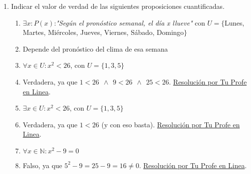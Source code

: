 \documentclass[a4paper]{article}
\newcommand{\answer}{\item[**]}
\newcommand{\exercise}{\item}
\newcommand{\then}{\to}
\newcommand{\eq}{\leftrightarrow}
\begin{document}
\begin{enumerate}
\begin{enumerate} [label=(\alph*)]
		\item Si un automóvil es cómodo, entonces es caro
		\answer ado el universo $U = \{x ~|~ x$ es un automóvil$\}$ y los predicados $P(x)$:\textit{"$x$ es cómodo"} y $Q(x)$:\textit{"$x$ es caro"}. Se simboliza $\forall x: P(x) \then  Q(x)$

		\item Hay gente que cuando tiene frío toma mate, y cuando no lo tiene no
		\answer Dado el universo $U = \{x ~|~ x$ es una persona$\}$, y los predicados $F(x)$:\textit{"$x$ tiene frío"}  y $M(x)$:\textit{"$x$ toma mate"}. Se simboliza $\exists x: F(x) \eq  M(x)$.

		\item Ningún pájaro es un anfibio. Si un animal no es un anfibio, tampoco será un pez. Por lo tanto, ningun pájaro es pez.
		\answer Dado el universo $U = \{x ~|~ x$ es un animal$\}$, y los predicados $P(x)$:\textit{"$x$ es un pájaro"}, $A(x)$:\textit{"$x$ es un anfibio"} y $Z(x):$\textit{"$x$ es un pez"}. Se simboliza \\ \Reasoning{$\forall x: P(x) \then \neg A(x)$; $\forall x: \neg A(x) \then \neg Z(x)$}{$\forall x: P(x) \then Z(x)$} \\ \href{https://youtu.be/M71MEB3TkVw?t=32}{Resolución por MathLogic}.

	\end{enumerate}


	\exercise Indicar el valor de verdad de las siguientes proposiciones cuantificadas. 
	\begin{enumerate} [label=(\alph*)]

		\item $\exists x: P(x)$:\textit{"Según el pronóstico semanal, el día x llueve"} con $U = \{$Lunes, Martes, Miércoles, Jueves, Viernes, Sábado, Domingo$\}$
		\answer Depende del pronóstico del clima de esa semana

		\item $\forall x \in U: x^2 < 26$, con $U=\{1,3,5\}$
		\answer Verdadera, ya que $1 < 26 ~~\land~~ 9 < 26 ~~\land~~ 25 < 26$. \href{https://youtu.be/ChfOh0xG7Ok?t=121}{Resolución por Tu Profe en Linea}.

		\item $\exists x \in U: x^2 < 26$, con $U=\{1,3,5\}$
		\answer Verdadera, ya que $1 < 26$ (y con eso basta). \href{https://youtu.be/ChfOh0xG7Ok?t=246}{Resolución por Tu Profe en Linea}.

		\item $\forall x \in \mathbb{N}: x^2 -9 =0$
		\answer Falso, ya que $5^2-9=25-9=16 \neq 0$. \href{https://youtu.be/ChfOh0xG7Ok?t=385}{Resolución por Tu Profe en Linea}.


\end{enumerate}
\end{enumerate}
\end{document}
